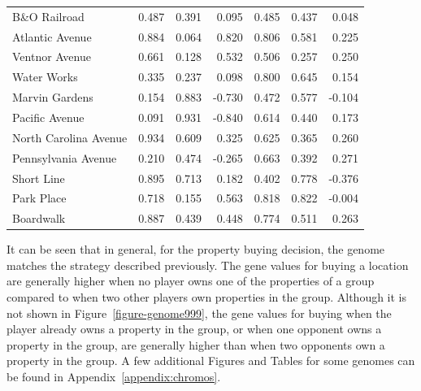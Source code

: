 \begin{table}[htbp]
{\begin{tabular}{lrrr|rrr}
    B\&O Railroad & 0.487  & 0.391  & 0.095  & 0.485  & 0.437  & 0.048 \\
    Atlantic Avenue & 0.884  & 0.064  & 0.820  & 0.806  & 0.581  & 0.225 \\
    Ventnor Avenue & 0.661  & 0.128  & 0.532  & 0.506  & 0.257  & 0.250 \\
    Water Works & 0.335  & 0.237  & 0.098  & 0.800  & 0.645  & 0.154 \\
    Marvin Gardens & 0.154  & 0.883  & -0.730 & 0.472  & 0.577  & -0.104 \\
    Pacific Avenue & 0.091  & 0.931  & -0.840 & 0.614  & 0.440  & 0.173 \\
    North Carolina Avenue & 0.934  & 0.609  & 0.325  & 0.625  & 0.365  & 0.260 \\
    Pennsylvania Avenue & 0.210  & 0.474  & -0.265 & 0.663  & 0.392  & 0.271 \\
    Short Line & 0.895  & 0.713  & 0.182  & 0.402  & 0.778  & -0.376 \\
    Park Place & 0.718  & 0.155  & 0.563  & 0.818  & 0.822  & -0.004 \\
    Boardwalk & 0.887  & 0.439  & 0.448  & 0.774  & 0.511  & 0.263 \\
    \bottomrule
    \end{tabular}}
  \label{tab:chromo_compare}%
\end{table}%

It can be seen that in general, for the property buying decision, the genome
matches the strategy described previously. The gene values for buying a location
are generally higher when no player owns one of the properties of a group
compared to when two other players own properties in the group. Although it is
not shown in Figure~\ref{figure-genome999}, the gene values for buying when the
player already owns a property in the group, or when one opponent owns a
property in the group, are generally higher than when two opponents own a
property in the group. A few additional Figures and Tables for some genomes can
be found in Appendix~\ref{appendix:chromos}.

